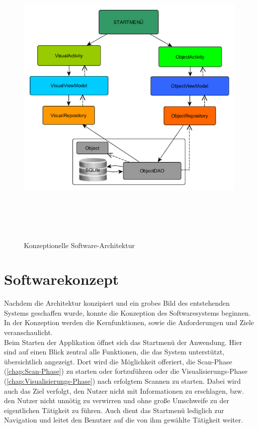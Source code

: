 \begin{figure}[hbt!]
    \centering
    \includegraphics[width=15cm,height=15cm,keepaspectratio]{3Konzeption/Bilder/architektur_konzept.png}
    \caption{Konzeptionelle Software-Architektur}
    \label{pic:architectur}
\end{figure}
\pagebreak
\section{Softwarekonzept}
\label{chap:Softwarekonzept}
Nachdem die Architektur konzipiert und ein grobes Bild des entstehenden Systems geschaffen wurde, konnte die Konzeption des 
Softwaresystems beginnen. In der Konzeption werden die Kernfunktionen, sowie die Anforderungen und Ziele veranschaulicht.
\\ 
\linebreak 
Beim Starten der Applikation öffnet sich das Startmenü der Anwendung. Hier sind auf einen Blick zentral alle Funktionen, die das System 
unterstützt, übersichtlich angezeigt. Dort wird die Möglichkeit offeriert, die Scan-Phase (\ref{chap:Scan-Phase}) zu starten oder fortzuführen 
oder die Visualisierungs-Phase (\ref{chap:Visualisierungs-Phase}) nach erfolgtem Scannen zu starten. Dabei wird auch das Ziel verfolgt, den 
Nutzer nicht mit Informationen zu erschlagen, bzw. den Nutzer nicht unnötig zu verwirren und ohne große Umschweife zu der eigentlichen Tätigkeit 
zu führen. Auch dient das Startmenü lediglich zur Navigation und leitet den Benutzer auf die von ihm gewählte Tätigkeit weiter.  
